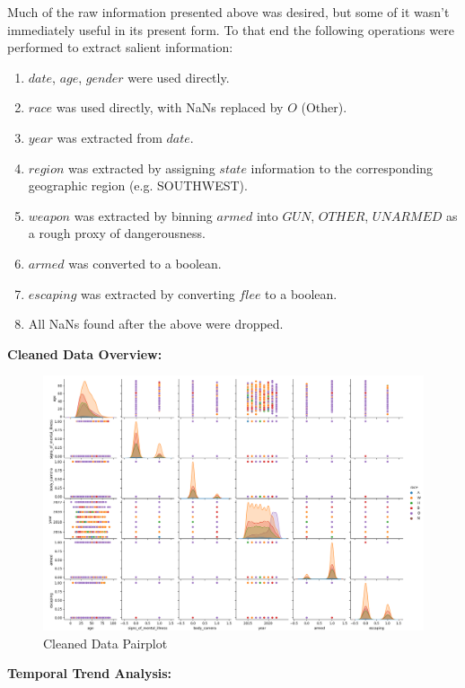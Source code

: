 \documentclass[12pt]{article}
\begin{document}
\begin{enumerate}[leftmargin=\labelsep]
  Much of the raw information presented above was desired, but some of it wasn't immediately useful in its present form.
  To that end the following operations were performed to extract salient information:
  \begin{enumerate}
    \item $date$, $age$, $gender$ were used directly.
    \item $race$ was used directly, with NaNs replaced by $O$ (Other).
    \item $year$ was extracted from $date$.
    \item $region$ was extracted by assigning $state$ information to the corresponding geographic region (e.g. SOUTHWEST).
    \item $weapon$ was extracted by binning $armed$ into $GUN$, $OTHER$, $UNARMED$ as a rough proxy of dangerousness.
    \item $armed$ was converted to a boolean.
    \item $escaping$ was extracted by converting $flee$ to a boolean.
    \item All NaNs found after the above were dropped.
  \end{enumerate}

  \textbf{Cleaned Data Overview:}

  \begin{figure}[htb]
    \begin{center}
      \includegraphics[width=\textwidth]{media/p2_pairplot.png}
    \end{center}
    \caption{Cleaned Data Pairplot}
    \label{fig:p2_pairplot}
  \end{figure}
  
  \textbf{Temporal Trend Analysis:}


\end{enumerate}
\end{document}
